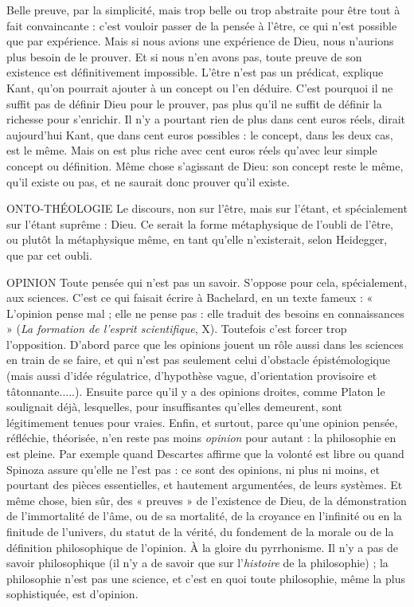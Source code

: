 Belle preuve, par la simplicité, mais trop belle ou trop abstraite pour être
tout à fait convaincante : c’est vouloir passer de la pensée à l’être, ce qui n’est
possible que par expérience. Mais si nous avions une expérience de Dieu, nous
n’aurions plus besoin de le prouver. Et si nous n’en avons pas, toute preuve de
son existence est définitivement impossible. L’être n’est pas un prédicat,
explique Kant, qu’on pourrait ajouter à un concept ou l’en déduire. C’est pourquoi
il ne suffit pas de définir Dieu pour le prouver, pas plus qu’il ne suffit de
définir la richesse pour s'enrichir. Il n’y a pourtant rien de plus dans cent euros
réels, dirait aujourd’hui Kant, que dans cent euros possibles : le concept, dans
les deux cas, est le même. Mais on est plus riche avec cent euros réels qu'avec
leur simple concept ou définition. Même chose s'agissant de Dieu: son
concept reste le même, qu’il existe ou pas, et ne saurait donc prouver qu’il
existe.

ONTO-THÉOLOGIE Le discours, non sur l’être, mais sur l’étant, et spécialement
sur l’étant suprême : Dieu. Ce serait la forme
métaphysique de l’oubli de l'être, ou plutôt la métaphysique même, en tant
qu’elle n’existerait, selon Heidegger, que par cet oubli.

OPINION Toute pensée qui n’est pas un savoir. S’oppose pour cela, spécialement,
aux sciences. C’est ce qui faisait écrire à Bachelard, en un
texte fameux : « L'opinion pense mal ; elle ne pense pas : elle traduit des besoins
en connaissances » ({\it La formation de l'esprit scientifique}, X). Toutefois c’est forcer
trop l’opposition. D'abord parce que les opinions jouent un rôle aussi dans les
sciences en train de se faire, et qui n’est pas seulement celui d’obstacle épistémologique
(mais aussi d’idée régulatrice, d’hypothèse vague, d’orientation provisoire
et tâtonnante.....). Ensuite parce qu’il y a des opinions droites, comme
Platon le soulignait déjà, lesquelles, pour insuffisantes qu’elles demeurent, sont
légitimement tenues pour vraies. Enfin, et surtout, parce qu’une opinion
pensée, réfléchie, théorisée, n’en reste pas moins {\it opinion} pour autant : la philosophie
en est pleine. Par exemple quand Descartes affirme que la volonté est
libre ou quand Spinoza assure qu’elle ne l’est pas : ce sont des opinions, ni plus
ni moins, et pourtant des pièces essentielles, et hautement argumentées, de
leurs systèmes. Et même chose, bien sûr, des « preuves » de l’existence de Dieu,
de la démonstration de l’immortalité de l’âme, ou de sa mortalité, de la
croyance en l’infinité ou en la finitude de l’univers, du statut de la vérité, du
fondement de la morale ou de la définition philosophique de l'opinion. À la
gloire du pyrrhonisme. Il n’y a pas de savoir philosophique (il n’y a de savoir
que sur l’{\it histoire} de la philosophie) ; la philosophie n’est pas une science, et
c’est en quoi toute philosophie, même la plus sophistiquée, est d'opinion.

